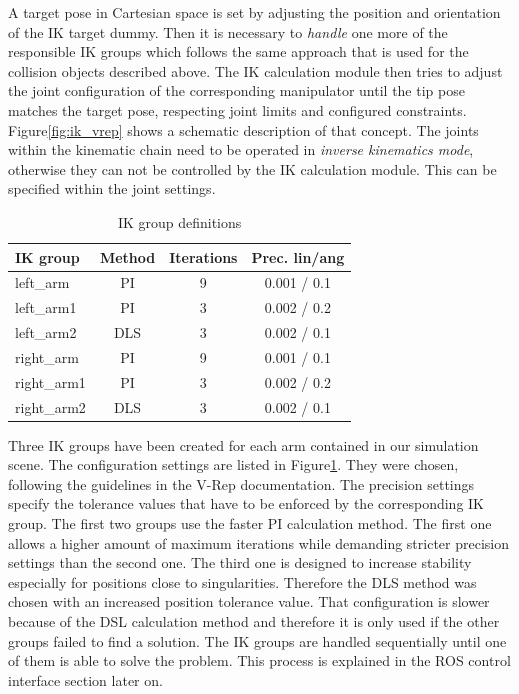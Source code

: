 A target pose in Cartesian space is set by adjusting the position and orientation of the IK target dummy. Then it is necessary to \emph{handle} one more of the responsible IK groups which follows the same approach that is used for the collision objects described above. The IK calculation module then tries to adjust the joint configuration of the corresponding manipulator until the tip pose matches the target pose, respecting joint limits and configured constraints. Figure\ref{fig:ik_vrep} shows a schematic description of that concept. The joints within the kinematic chain need to be operated in \emph{inverse kinematics mode}, otherwise they can not be controlled by the IK calculation module. This can be specified within the joint settings. \\

\begin{table}[h]
  \centering
  \begin{tabular}[h]{|l|c|c|c|} \hline
	\textbf{IK group} & \textbf{Method} & \textbf{Iterations} & \textbf{Prec. lin/ang} \\ \hline
	left\_arm & PI & 9 & 0.001 / 0.1  \\
	left\_arm1 & PI & 3 & 0.002 / 0.2  \\
	left\_arm2 & DLS & 3 & 0.002 / 0.1  \\
	right\_arm & PI & 9 & 0.001 / 0.1  \\
	right\_arm1 & PI & 3 & 0.002 / 0.2  \\
	right\_arm2 & DLS & 3 & 0.002 / 0.1  \\ \hline
  \end{tabular}
  \caption{IK group definitions}
  \label{fig:ik_defs}
\end{table}

Three IK groups have been created for each arm contained in our simulation scene. The configuration settings are listed in Figure\ref{fig:ik_defs}. They were chosen, following the guidelines in the V-Rep documentation. The precision settings specify the tolerance values that have to be enforced by the corresponding IK group. The first two groups use the faster PI calculation method. The first one allows a higher amount of maximum iterations while demanding stricter precision settings than the second one. The third one is designed to increase stability especially for positions close to singularities. Therefore the DLS method was chosen with an increased position tolerance value. That configuration is slower because of the DSL calculation method and therefore it is only used if the other groups failed to find a solution. The IK groups are handled sequentially until one of them is able to solve the problem. This process is explained in the ROS control interface section later on.

